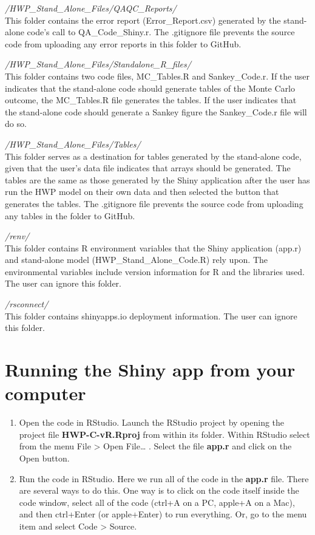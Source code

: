 \documentclass[
  openany]{book}
\begin{document}
\emph{/HWP\_Stand\_Alone\_Files/QAQC\_Reports/}\\
This folder contains the error report (Error\_Report.csv) generated by
the stand-alone code's call to QA\_Code\_Shiny.r. The .gitignore file
prevents the source code from uploading any error reports in this folder
to GitHub.

\emph{/HWP\_Stand\_Alone\_Files/Standalone\_R\_files/}\\
This folder contains two code files, MC\_Tables.R and Sankey\_Code.r. If
the user indicates that the stand-alone code should generate tables of
the Monte Carlo outcome, the MC\_Tables.R file generates the tables. If
the user indicates that the stand-alone code should generate a Sankey
figure the Sankey\_Code.r file will do so.

\emph{/HWP\_Stand\_Alone\_Files/Tables/}\\
This folder serves as a destination for tables generated by the
stand-alone code, given that the user's data file indicates that arrays
should be generated. The tables are the same as those generated by the
Shiny application after the user has run the HWP model on their own data
and then selected the button that generates the tables. The .gitignore
file prevents the source code from uploading any tables in the folder to
GitHub.

\emph{/renv/}\\
This folder contains R environment variables that the Shiny application
(app.r) and stand-alone model (HWP\_Stand\_Alone\_Code.R) rely upon. The
environmental variables include version information for R and the
libraries used. The user can ignore this folder.

\emph{/rsconnect/}\\
This folder contains shinyapps.io deployment information. The user can
ignore this folder.

\hypertarget{dnld-shiny}{%
\section{Running the Shiny app from your computer}\label{dnld-shiny}}

\begin{enumerate}
\def\labelenumi{\arabic{enumi}.}
\item
  Open the code in RStudio. Launch the RStudio project by opening the
  project file \textbf{HWP-C-vR.Rproj} from within its folder. Within
  RStudio select from the menu File \textgreater{} Open File\ldots{} .
  Select the file \textbf{app.r} and click on the Open button.
\item
  Run the code in RStudio. Here we run all of the code in the
  \textbf{app.r} file. There are several ways to do this. One way is to
  click on the code itself inside the code window, select all of the
  code (ctrl+A on a PC, apple+A on a Mac), and then ctrl+Enter (or
  apple+Enter) to run everything. Or, go to the menu item and select
  Code \textgreater{} Source.
\end{enumerate}
\end{document}
